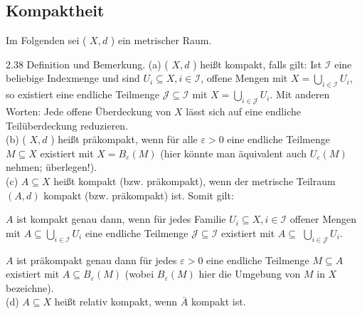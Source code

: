 \documentclass[10pt, letterpaper]{article}
\begin{document}
\pagebreak


\subsection*{Kompaktheit}
Im Folgenden sei ( $X, d$ ) ein metrischer Raum.

2.38 Definition und Bemerkung. (a) ( $X, d$ ) heißt kompakt, falls gilt: Ist $\mathcal{I}$ eine beliebige Indexmenge und sind $U_{i} \subseteq X, i \in \mathcal{I}$, offene Mengen mit $X=\bigcup_{i \in \mathcal{I}} U_{i}$, so existiert eine endliche Teilmenge $\mathcal{J} \subseteq \mathcal{I}$ mit $X=\bigcup_{i \in \mathcal{J}} U_{i}$. Mit anderen Worten: Jede offene Überdeckung von $X$ lässt sich auf eine endliche Teilüberdeckung reduzieren.\\
(b) ( $X, d$ ) heißt präkompakt, wenn für alle $\varepsilon>0$ eine endliche Teilmenge $M \subseteq X$ existiert mit $X=B_{\varepsilon}(M)$ (hier könnte man äquivalent auch $U_{\varepsilon}(M)$ nehmen; überlegen!).\\
(c) $A \subseteq X$ heißt kompakt (bzw. präkompakt), wenn der metrische Teilraum $(A, d)$ kompakt (bzw. präkompakt) ist. Somit gilt:

 $A$ ist kompakt genau dann, wenn für jedes Familie $U_{i} \subseteq X, i \in \mathcal{I}$ offener Mengen mit $A \subseteq \bigcup_{i \in \mathcal{I}} U_{i}$ eine endliche Teilmenge $\mathcal{J} \subseteq \mathcal{I}$ existiert mit $A \subseteq$ $\bigcup_{i \in \mathcal{J}} U_{i}$.
 
 $A$ ist präkompakt genau dann für jedes $\varepsilon>0$ eine endliche Teilmenge $M \subseteq A$ existiert mit $A \subseteq B_{\varepsilon}(M)$ (wobei $B_{\varepsilon}(M)$ hier die Umgebung von $M$ in $X$ bezeichne).\\

(d) $A \subseteq X$ heißt relativ kompakt, wenn $\bar{A}$ kompakt ist.\\
\end{document}
